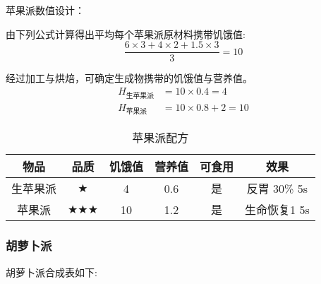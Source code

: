 苹果派数值设计：

由下列公式计算得出平均每个苹果派原材料携带饥饿值:
\begin{equation}
    \frac{6 \times 3 + 4 \times 2 + 1.5 \times 3}{3} = 10 \nonumber
\end{equation}

经过加工与烘焙，可确定生成物携带的饥饿值与营养值。
\begin{equation}
    \begin{aligned}
        H_{\text{生苹果派}} & = 10 \times 0.4 = 4 \\
        H_{\text{苹果派}} & = 10 \times 0.8 + 2 = 10 \nonumber
    \end{aligned}
\end{equation}

\begin{table}[H]
    \centering
    \caption{苹果派配方}
    \setlength{\tabcolsep}{4mm}
    \begin{tabular}{c|ccc|cc}
        \toprule
        \textbf{物品} & \textbf{品质} & \textbf{饥饿值} & \textbf{营养值} & \textbf{可食用} & \textbf{效果}\\
        \midrule
        生苹果派 & $\bigstar$ &4 & 0.6 & 是 & 反胃 30\% 5s \\
        苹果派 & $\bigstar \bigstar \bigstar$ &10 & 1.2 & 是 & 生命恢复1 5s \\
        \bottomrule
    \end{tabular}
\end{table}

\subsubsection{胡萝卜派}

胡萝卜派合成表如下:

